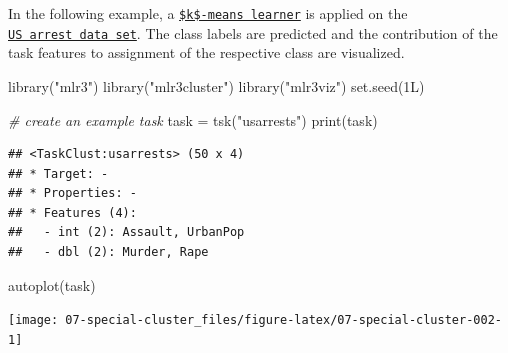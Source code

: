 \documentclass[
]{scrbook}
\newenvironment{Shaded}{\begin{snugshade}}{\end{snugshade}}
\newcommand{\CommentTok}[1]{\textcolor[rgb]{0.56,0.35,0.01}{\textit{#1}}}
\newcommand{\FunctionTok}[1]{\textcolor[rgb]{0.00,0.00,0.00}{#1}}
\newcommand{\NormalTok}[1]{#1}
\newcommand{\OtherTok}[1]{\textcolor[rgb]{0.56,0.35,0.01}{#1}}
\newcommand{\SpecialCharTok}[1]{\textcolor[rgb]{0.00,0.00,0.00}{#1}}
\newcommand{\StringTok}[1]{\textcolor[rgb]{0.31,0.60,0.02}{#1}}
\renewenvironment{Shaded} {\begin{snugshade}\small} {\end{snugshade}}
\begin{document}
In the following example, a \href{https://mlr3cluster.mlr-org.com/reference/mlr_learners_clust.kmeans.html}{\texttt{\$k\$-means\ learner}} is applied on the \href{https://mlr3cluster.mlr-org.com/reference/mlr_tasks_usarrests.html}{\texttt{US\ arrest\ data\ set}}.
The class labels are predicted and the contribution of the task features to assignment of the respective class are visualized.

\begin{Shaded}
\begin{Highlighting}[]
\FunctionTok{library}\NormalTok{(}\StringTok{"mlr3"}\NormalTok{)}
\FunctionTok{library}\NormalTok{(}\StringTok{"mlr3cluster"}\NormalTok{)}
\FunctionTok{library}\NormalTok{(}\StringTok{"mlr3viz"}\NormalTok{)}
\FunctionTok{set.seed}\NormalTok{(1L)}

\CommentTok{\# create an example task}
\NormalTok{task }\OtherTok{=} \FunctionTok{tsk}\NormalTok{(}\StringTok{"usarrests"}\NormalTok{)}
\FunctionTok{print}\NormalTok{(task)}
\end{Highlighting}
\end{Shaded}

\begin{verbatim}
## <TaskClust:usarrests> (50 x 4)
## * Target: -
## * Properties: -
## * Features (4):
##   - int (2): Assault, UrbanPop
##   - dbl (2): Murder, Rape
\end{verbatim}

\begin{Shaded}
\begin{Highlighting}[]
\FunctionTok{autoplot}\NormalTok{(task)}
\end{Highlighting}
\end{Shaded}

\begin{center}\texttt{[image: 07-special-cluster\_files/figure-latex/07-special-cluster-002-1]} \end{center}

\begin{Shaded}
\end{Shaded}
\end{document}
